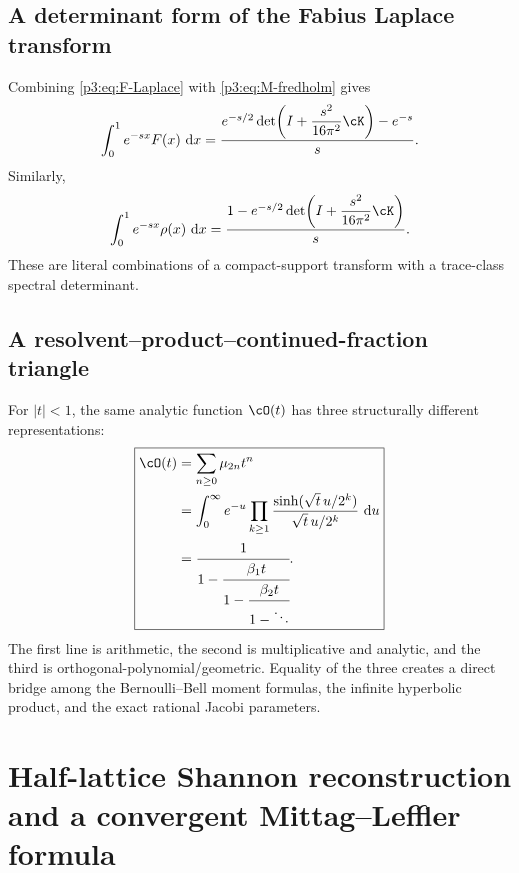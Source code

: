 \documentclass[11pt,oneside]{article}
\theoremstyle{definition}
\newcommand{\dd}{\,\mathrm d}
\begin{document}
\subsection{A determinant form of the Fabius Laplace transform}

Combining \eqref{p3:eq:F-Laplace} with \eqref{p3:eq:M-fredholm} gives
\begin{equation}
 \int_0^1e^{-sx}F(x)\,\dd x
 =\frac{e^{-s/2}
 \det\!\left(I+\dfrac{s^2}{16\pi^2}\cK\right)-e^{-s}}{s}.  \label{p3:eq:F-Laplace-determinant}
\end{equation}
Similarly,
\begin{equation}
 \int_0^1e^{-sx}\rho(x)\,\dd x
 =\frac{1-e^{-s/2}
 \det\!\left(I+\dfrac{s^2}{16\pi^2}\cK\right)}{s}.         \label{p3:eq:rho-half-determinant}
\end{equation}
These are literal combinations of a compact-support transform with a trace-class spectral
determinant.

\subsection{A resolvent--product--continued-fraction triangle}

For \(|t|<1\), the same analytic function \(\cO(t)\) has three structurally different
representations:
\begin{equation}
 \boxed{
 \begin{aligned}
 \cO(t)
 &=\sum_{n\ge0}\mu_{2n}t^n\\
 &=\int_0^{\infty}e^{-u}
   \prod_{k\ge1}\frac{\sinh(\sqrt t\,u/2^k)}{\sqrt t\,u/2^k}\,\dd u\\
 &=\cfrac{1}{1-\cfrac{\beta_1t}{1-\cfrac{\beta_2t}{1-\ddots}}}.
 \end{aligned}
 }                                                           \label{p3:eq:triangle}
\end{equation}
The first line is arithmetic, the second is multiplicative and analytic, and the third is
orthogonal-polynomial/geometric.  Equality of the three creates a direct bridge among the
Bernoulli--Bell moment formulas, the infinite hyperbolic product, and the exact rational
Jacobi parameters.


\section{Half-lattice Shannon reconstruction and a convergent Mittag--Leffler formula}
\label{p3:sec:half-lattice-sampling}
\end{document}
